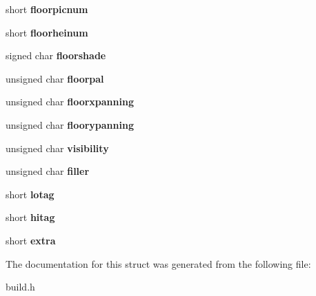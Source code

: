 \begin{DoxyCompactItemize}
\item 
short {\bfseries floorpicnum}\label{structsectortype_aa6d9d1f158fc14c47d3e53ef93c39f69}

\item 
short {\bfseries floorheinum}\label{structsectortype_acff1fe6d88bdceb96240ef87ddc06933}

\item 
signed char {\bfseries floorshade}\label{structsectortype_ac3261ce425e1c28f7eba255d3032eee7}

\item 
unsigned char {\bfseries floorpal}\label{structsectortype_af7a458bd1573bfeb64a339b536c8e2a9}

\item 
unsigned char {\bfseries floorxpanning}\label{structsectortype_a032640834999719623f410c42c78e6fc}

\item 
unsigned char {\bfseries floorypanning}\label{structsectortype_a05d898de93bcb0e1f44d47d4f284412c}

\item 
unsigned char {\bfseries visibility}\label{structsectortype_a5920fe1de32ba707787670b3712e9c0e}

\item 
unsigned char {\bfseries filler}\label{structsectortype_a8dab570941c1248ab79c0a345338c789}

\item 
short {\bfseries lotag}\label{structsectortype_a4bb864d7704ea70320ce49cfe40d9431}

\item 
short {\bfseries hitag}\label{structsectortype_a1840c75ea9bb957e397f7bdceadc52bb}

\item 
short {\bfseries extra}\label{structsectortype_a981a71dde56bfa136b3c2904018af537}

\end{DoxyCompactItemize}


The documentation for this struct was generated from the following file\-:\begin{DoxyCompactItemize}
\item 
build.\-h\end{DoxyCompactItemize}
